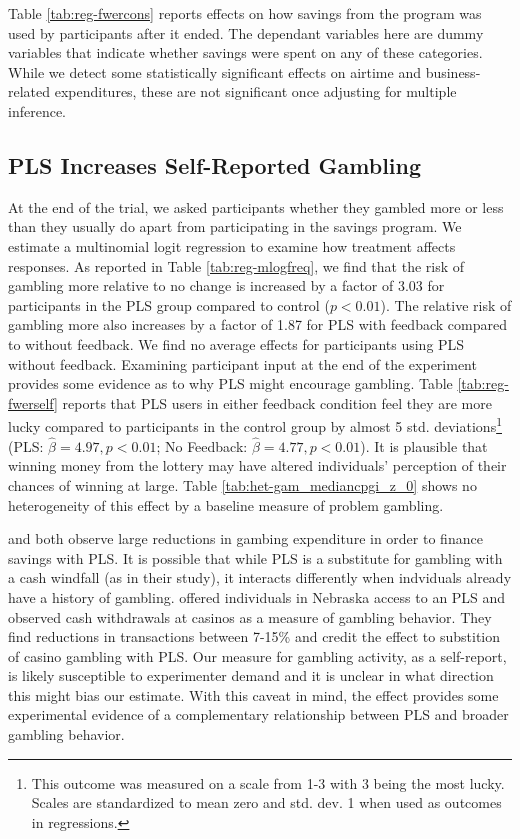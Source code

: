 \documentclass[11pt]{article}
\begin{document}
		

		Table \ref{tab:reg-fwercons} reports effects on how savings from the program was used by participants after it ended. The dependant variables here are dummy variables that indicate whether savings were spent on any of these categories. While we detect some statistically significant effects on airtime and business-related expenditures, these are not significant once adjusting for multiple inference.

		

	\subsection{PLS Increases Self-Reported Gambling}

		At the end of the trial, we asked participants whether they gambled more or less than they usually do apart from participating in the savings program. We estimate a multinomial logit regression to examine how treatment affects responses. As reported in Table \ref{tab:reg-mlogfreq}, we find that the risk of gambling more relative to no change is increased by a factor of 3.03 for participants in the PLS group compared to control ($p < 0.01$). The relative risk of gambling more also increases by a factor of 1.87 for PLS with feedback compared to without feedback. We find no average effects for participants using PLS without feedback. Examining participant input at the end of the experiment provides some evidence as to why PLS might encourage gambling. Table \ref{tab:reg-fwerself} reports that PLS users in either feedback condition feel they are more lucky compared to participants in the control group by almost 5 std. deviations\footnote{This outcome was measured on a scale from 1-3 with 3 being the most lucky. Scales are standardized to mean zero and std. dev. 1 when used as outcomes in regressions.} (PLS: $\hat \beta = 4.97, p < 0.01$; No Feedback: $\hat \beta = 4.77, p < 0.01$). It is plausible that winning money from the lottery may have altered individuals' perception of their chances of winning at large. Table \ref{tab:het-gam_mediancpgi_z_0} shows no heterogeneity of this effect by a baseline measure of problem gambling.

		\textcite{atalay_savings_2014} and \textcite{dizon_leveraging_2016} both observe large reductions in gambing expenditure in order to finance savings with PLS. It is possible that while PLS is a substitute for gambling with a cash windfall (as in their study), it interacts differently when indviduals already have a history of gambling. \textcite{cookson_when_2016} offered individuals in Nebraska access to an PLS and observed cash withdrawals at casinos as a measure of gambling behavior. They find reductions in transactions between 7-15\% and credit the effect to substition of casino gambling with PLS. Our measure for gambling activity, as a self-report, is likely susceptible to experimenter demand and it is unclear in what direction this might bias our estimate. With this caveat in mind, the effect provides some experimental evidence of a complementary relationship between PLS and broader gambling behavior.
\end{document}
